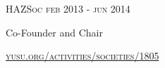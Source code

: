 {
    \textsc{\small{HAZSoc
            \hfill
            {\raggedleft
                feb 2013 - jun 2014
            }
        }
    }

    {\raggedright\large {
        Co-Founder and Chair
    } \\}

    \textsc{\small\href{https://www.yusu.org/activities/societies/1805}{yusu.org/activities/societies/1805}}
} \\
